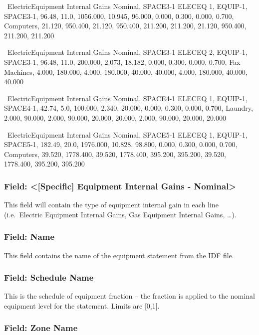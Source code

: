~ElectricEquipment Internal Gains Nominal, SPACE3-1 ELECEQ 1, EQUIP-1, SPACE3-1, 96.48, 11.0, 1056.000, 10.945, 96.000, 0.000, 0.300, 0.000, 0.700, Computers, 21.120, 950.400, 21.120, 950.400, 211.200, 211.200, 21.120, 950.400, 211.200, 211.200~

~ElectricEquipment Internal Gains Nominal, SPACE3-1 ELECEQ 2, EQUIP-1, SPACE3-1, 96.48, 11.0, 200.000, 2.073, 18.182, 0.000, 0.300, 0.000, 0.700, Fax Machines, 4.000, 180.000, 4.000, 180.000, 40.000, 40.000, 4.000, 180.000, 40.000, 40.000

~ElectricEquipment Internal Gains Nominal, SPACE4-1 ELECEQ 1, EQUIP-1, SPACE4-1, 42.74, 5.0, 100.000, 2.340, 20.000, 0.000, 0.300, 0.000, 0.700, Laundry, 2.000, 90.000, 2.000, 90.000, 20.000, 20.000, 2.000, 90.000, 20.000, 20.000

~ElectricEquipment Internal Gains Nominal, SPACE5-1 ELECEQ 1, EQUIP-1, SPACE5-1, 182.49, 20.0, 1976.000, 10.828, 98.800, 0.000, 0.300, 0.000, 0.700, Computers, 39.520, 1778.400, 39.520, 1778.400, 395.200, 395.200, 39.520, 1778.400, 395.200, 395.200



\subsubsection{Field: \textless{}{[}Specific{]} Equipment Internal Gains - Nominal\textgreater{}}\label{field-specific-equipment-internal-gains---nominal}

This field will contain the type of equipment internal gain in each line (i.e.~Electric Equipment Internal Gains, Gas Equipment Internal Gains, \ldots{}).

\subsubsection{Field: Name}\label{field-name-3}

This field contains the name of the equipment statement from the IDF file.

\subsubsection{Field: Schedule Name}\label{field-schedule-name-2}

This is the schedule of equipment fraction -- the fraction is applied to the nominal equipment level for the statement. Limits are {[}0,1{]}.

\subsubsection{Field: Zone Name}\label{field-zone-name-4}


